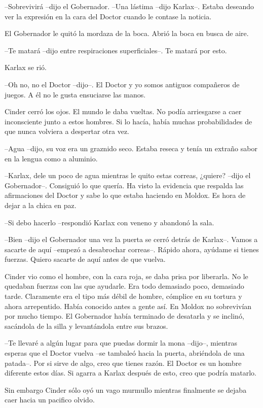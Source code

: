 --Sobrevivirá --dijo el Gobernador. 
--Una lástima --dijo Karlax--. Estaba deseando ver la expresión en la cara del Doctor cuando le contase la noticia. 

El Gobernador le quitó la mordaza de la boca. Abrió la boca en busca de aire. 

--Te matará --dijo entre respiraciones superficiales--. Te matará por esto. 

Karlax se rió. 

--Oh no, no el Doctor --dijo--. El Doctor y yo somos antiguos compañeros de juegos. A él no le gusta ensuciarse las manos. 

Cinder cerró los ojos. El mundo le daba vueltas. No podía arriesgarse a caer inconsciente junto a estos hombres. Si lo hacía, había muchas probabilidades de que nunca volviera a despertar otra vez. 

--Agua --dijo, su voz era un graznido seco. Estaba reseca y tenía un extraño sabor en la lengua como a aluminio. 

--Karlax, dele un poco de agua mientras le quito estas correas, ¿quiere? --dijo el Gobernador--. Consiguió lo que quería. Ha visto la evidencia que respalda las afirmaciones del Doctor y sabe lo que estaba haciendo en Moldox. Es hora de dejar a la chica en paz. 

--Si debo hacerlo --respondió Karlax con veneno y abandonó la sala. 

--Bien --dijo el Gobernador una vez la puerta se cerró detrás de Karlax--. Vamos a sacarte de aquí --empezó a desabrochar correas--. Rápido ahora, ayúdame si tienes fuerzas. Quiero sacarte de aquí antes de que vuelva.
 
Cinder vio como el hombre, con la cara roja, se daba prisa por liberarla. No le quedaban fuerzas con las que ayudarle. Era todo demasiado poco, demasiado tarde. Claramente era el tipo más débil de hombre, cómplice en su tortura y ahora arrepentido. Había conocido antes a gente así. En Moldox no sobrevivían por mucho tiempo. 
El Gobernador había terminado de desatarla y se inclinó, sacándola de la silla y levantándola entre sus brazos. 

--Te llevaré a algún lugar para que puedas dormir la mona --dijo--, mientras esperas que el Doctor vuelva --se tambaleó hacia la puerta, abriéndola de una patada--. Por si sirve de algo, creo que tienes razón. El Doctor es un hombre diferente estos días. Si agarra a Karlax después de esto, creo que podría matarlo. 

Sin embargo Cinder sólo oyó un vago murmullo mientras finalmente se dejaba caer hacia un pacifico olvido.


